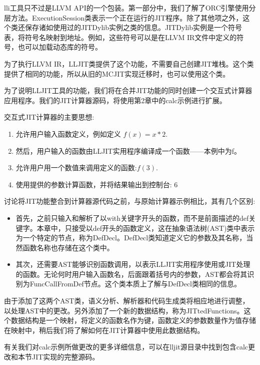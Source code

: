 
lli工具只不过是LLVM API的一个包装。第一部分中，我们了解了ORC引擎使用分层方法。ExecutionSession类表示一个正在运行的JIT程序。除了其他项之外，这个类还保存诸如使用过的JITDylib实例之类的信息。JITDylib实例是一个符号表，将符号名映射到地址。例如，这些符号可以是在LLVM IR文件中定义的符号，也可以加载动态库的符号。

为了执行LLVM IR，LLJIT类提供了这个功能，不需要自己创建JIT堆栈。这个类提供了相同的功能，所以从旧的MCJIT实现迁移时，也可以使用这个类。

为了说明LLJIT工具的功能，我们将在合并JIT功能的同时创建一个交互式计算器应用程序。我们的JIT计算器源码，将使用第2章中的calc示例进行扩展。

交互式JIT计算器的主要思想:

\begin{enumerate}
\item
允许用户输入函数定义，例如定义 $f(x) = x*2$.

\item
然后，用户输入的函数由LLJIT实用程序编译成一个函数——本例中为f。

\item
允许用户用一个数值来调用定义的函数:$f(3)$.

\item
使用提供的参数计算函数，并将结果输出到控制台: 6
\end{enumerate}

讨论将JIT功能整合到计算器源代码之前，与原始计算器示例相比，其有几个区别:

\begin{itemize}
\item
首先，之前只输入和解析了以with关键字开头的函数，而不是前面描述的def关键字。本章中，只接受以def开头的函数定义，这在抽象语法树(AST)类中表示为一个特定的节点，称为DefDecl。DefDecl类知道定义它的参数及其名称，当然函数名称也存储在这个类中。

\item
其次，还需要AST能够识别函数调用，以表示LLJIT实用程序使用或JIT处理的函数。无论何时用户输入函数名，后面跟着括号内的参数，AST都会将其识别为FuncCallFromDef节点。这个类本质上了解与DefDecl类相同的信息。
\end{itemize}

由于添加了这两个AST类，语义分析、解析器和代码生成类将相应地进行调整，以处理AST中的更改。另外添加了一个新的数据结构，称为JITtedFunctions。这个数据结构是一个映射，将定义的函数名作为键，函数定义的参数数量作为值存储在映射中，稍后我们将了解如何在JIT计算器中使用此数据结构。

有关我们对calc示例所做更改的更多详细信息，可以在lljit源目录中找到包含calc更改和本节JIT实现的完整源码。

